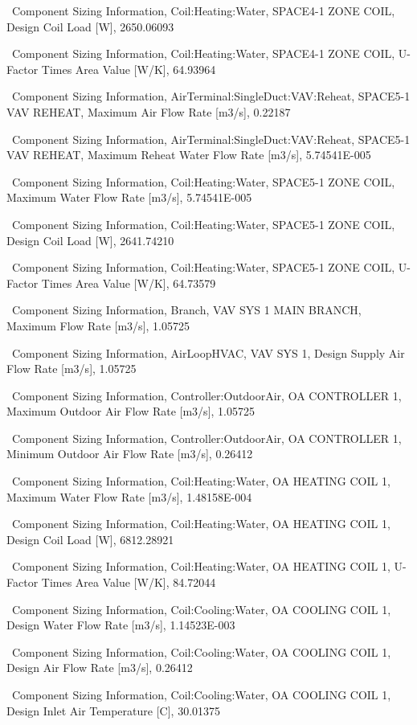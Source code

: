 ~Component Sizing Information, Coil:Heating:Water, SPACE4-1 ZONE COIL, Design Coil Load {[}W{]}, 2650.06093

~Component Sizing Information, Coil:Heating:Water, SPACE4-1 ZONE COIL, U-Factor Times Area Value {[}W/K{]}, 64.93964

~Component Sizing Information, AirTerminal:SingleDuct:VAV:Reheat, SPACE5-1 VAV REHEAT, Maximum Air Flow Rate {[}m3/s{]}, 0.22187

~Component Sizing Information, AirTerminal:SingleDuct:VAV:Reheat, SPACE5-1 VAV REHEAT, Maximum Reheat Water Flow Rate {[}m3/s{]}, 5.74541E-005

~Component Sizing Information, Coil:Heating:Water, SPACE5-1 ZONE COIL, Maximum Water Flow Rate {[}m3/s{]}, 5.74541E-005

~Component Sizing Information, Coil:Heating:Water, SPACE5-1 ZONE COIL, Design Coil Load {[}W{]}, 2641.74210

~Component Sizing Information, Coil:Heating:Water, SPACE5-1 ZONE COIL, U-Factor Times Area Value {[}W/K{]}, 64.73579

~Component Sizing Information, Branch, VAV SYS 1 MAIN BRANCH, Maximum Flow Rate {[}m3/s{]}, 1.05725

~Component Sizing Information, AirLoopHVAC, VAV SYS 1, Design Supply Air Flow Rate {[}m3/s{]}, 1.05725

~Component Sizing Information, Controller:OutdoorAir, OA CONTROLLER 1, Maximum Outdoor Air Flow Rate {[}m3/s{]}, 1.05725

~Component Sizing Information, Controller:OutdoorAir, OA CONTROLLER 1, Minimum Outdoor Air Flow Rate {[}m3/s{]}, 0.26412

~Component Sizing Information, Coil:Heating:Water, OA HEATING COIL 1, Maximum Water Flow Rate {[}m3/s{]}, 1.48158E-004

~Component Sizing Information, Coil:Heating:Water, OA HEATING COIL 1, Design Coil Load {[}W{]}, 6812.28921

~Component Sizing Information, Coil:Heating:Water, OA HEATING COIL 1, U-Factor Times Area Value {[}W/K{]}, 84.72044

~Component Sizing Information, Coil:Cooling:Water, OA COOLING COIL 1, Design Water Flow Rate {[}m3/s{]}, 1.14523E-003

~Component Sizing Information, Coil:Cooling:Water, OA COOLING COIL 1, Design Air Flow Rate {[}m3/s{]}, 0.26412

~Component Sizing Information, Coil:Cooling:Water, OA COOLING COIL 1, Design Inlet Air Temperature {[}C{]}, 30.01375

